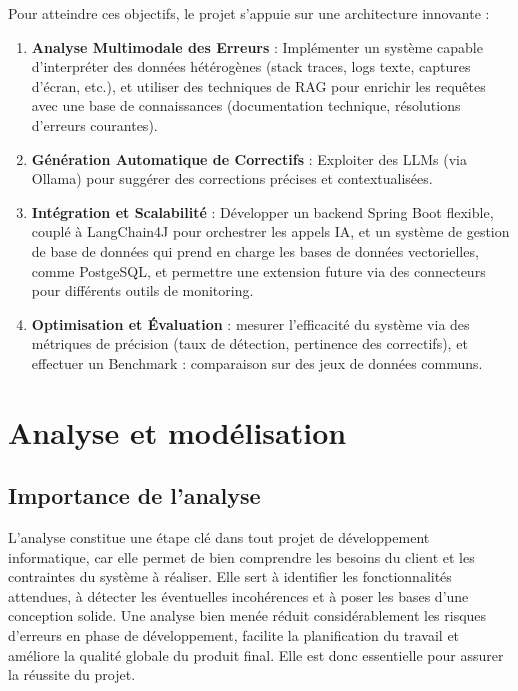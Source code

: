 \documentclass[12pt,a4paper]{report}
\begin{document}
	
	
	Pour atteindre ces objectifs, le projet s’appuie sur une architecture innovante :
	
	\begin{enumerate}
		\item \textbf{Analyse Multimodale des Erreurs} : Implémenter un système capable d’interpréter des données hétérogènes (stack traces, logs texte, captures d’écran, etc.), et utiliser des techniques de RAG pour enrichir les requêtes avec une base de connaissances (documentation technique, résolutions d’erreurs courantes).
		
		\item \textbf{Génération Automatique de Correctifs} : Exploiter des LLMs (via Ollama) pour suggérer des corrections précises et contextualisées.
		
		\item \textbf{Intégration et Scalabilité} : Développer un backend Spring Boot flexible, couplé à LangChain4J pour orchestrer les appels IA, et un système de gestion de base de données qui prend en charge les bases de données vectorielles, comme PostgeSQL, et permettre une extension future via des connecteurs pour différents outils de monitoring.
		
		\item \textbf{Optimisation et Évaluation} : mesurer l’efficacité du système via des métriques de précision (taux de détection, pertinence des correctifs), et effectuer un Benchmark : comparaison sur des jeux de données communs.
		
	\end{enumerate}
	

	
	\chapter{Analyse et modélisation}
	
	\section{Importance de l'analyse}
	
	L’analyse constitue une étape clé dans tout projet de développement informatique, car elle permet de bien comprendre les besoins du client et les contraintes du système à réaliser. Elle sert à identifier les fonctionnalités attendues, à détecter les éventuelles incohérences et à poser les bases d’une conception solide. Une analyse bien menée réduit considérablement les risques d’erreurs en phase de développement, facilite la planification du travail et améliore la qualité globale du produit final. Elle est donc essentielle pour assurer la réussite du projet.
	
\end{document}
